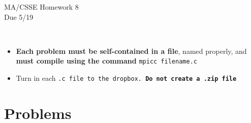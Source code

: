 \documentclass{article}
\begin{document}
\begin{center}
\Large{MA/CSSE Homework 8}\\
Due 5/19
\end{center}
\vspace{.25in}
\\
  \begin{itemize}
   \item \textbf{Each problem must be self-contained in a file}, named
     properly, and \textbf{must compile using the
      command} \texttt{mpicc filename.c}\\

  \item Turn in each \tt{.c} file to the dropbox. \textbf{Do not
      create a \tt{.zip} file}

  \end{itemize}


\section*{Problems}
\end{document}
